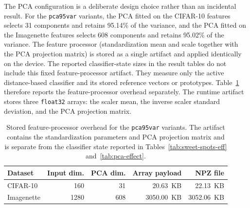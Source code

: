 \documentclass[sigconf,review,nonacm]{acmart}
\begin{document}
The PCA configuration is a deliberate design choice rather than an incidental result.
For the \texttt{pca95var} variants, the PCA fitted on the CIFAR-10 features selects 31 components and retains 95.14\% of the variance, and the PCA fitted on the Imagenette features selects 608 components and retains 95.02\% of the variance.
The feature processor (standardization mean and scale together with the PCA projection matrix) is stored as a single artifact and applied identically on the device.
The reported classifier-state sizes in the result tables do not include this fixed feature-processor artifact. They measure only the active distance-based classifier and its stored reference vectors or prototypes.
Table~\ref{tab:feature-processor-overhead} therefore reports the feature-processor overhead separately.
The runtime artifact stores three \texttt{float32} arrays: the scaler mean, the inverse scaler standard deviation, and the PCA projection matrix.

\begin{table}[t]
  \caption{Stored feature-processor overhead for the \texttt{pca95var} variants. The artifact contains the standardization parameters and PCA projection matrix and is separate from the classifier state reported in Tables~\ref{tab:sweet-spots-eff} and~\ref{tab:pca-effect}.}
  \label{tab:feature-processor-overhead}
  \centering
  \footnotesize
  \begin{tabular}{@{}lrrrr@{}}
    \toprule
    Dataset & Input dim. & PCA dim. & Array payload & NPZ file \\
    \midrule
    CIFAR-10 & 160 & 31 & 20.63~KB & 22.13~KB \\
    Imagenette & 1280 & 608 & 3050.00~KB & 3052.06~KB \\
    \bottomrule
  \end{tabular}
\end{table}
\end{document}
